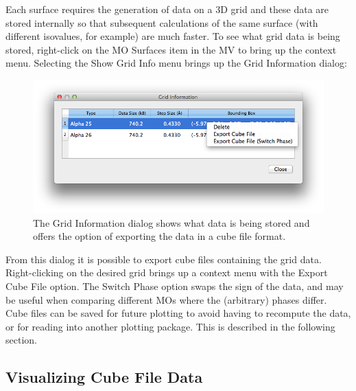 \documentclass[a4paper,12pt]{article}
\begin{document}
Each surface requires the generation of data on a 3D grid and these data are
stored internally so that subsequent calculations of the same surface (with
different isovalues, for example) are much faster.  To see what grid data is
being stored, right-click on the MO Surfaces item in the MV to bring up the
context menu.  Selecting the Show Grid Info menu brings up the Grid Information
dialog:
\begin{figure}[h]
\begin{center}
\includegraphics[scale=0.4]{figures/GridInfo.png}
\caption{The Grid Information dialog shows what data is being stored and
offers the option of exporting the data in a cube file format.}
\end{center}
\end{figure}

From this dialog it is possible to export cube files containing the grid data.
Right-clicking on the desired grid brings up a context menu with the 
Export Cube File option.  The Switch Phase option swaps the sign of the data,
and may be useful when comparing different MOs where the (arbitrary) phases
differ.  Cube files can be saved for future plotting to avoid having to
recompute the data, or for reading into another plotting package.  This is
described in the following section.


\subsection{Visualizing Cube File Data}
\end{document}
